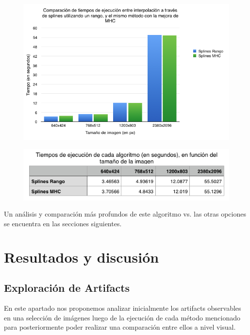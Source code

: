 \documentclass[a4paper]{article}
\begin{document}
\begin{figure}[h!]
    \begin{center}
    \includegraphics[scale=0.65]{imagenes/tiempos/rangmhcg.png}
    \label{tiemposrang}
  \end{center}
\end{figure}

\begin{figure}[h!]
    \begin{center}
    \includegraphics[scale=0.70]{imagenes/tiempos/rangmhct.png}
    \label{tiempos1}
  \end{center}
\end{figure}


Un análisis y comparación más profundos de este algoritmo vs. las otras opciones se encuentra en las secciones siguientes.



\newpage
\section{Resultados y discusi\'on}
\subsection{Exploraci\'on de Artifacts}


En este apartado nos proponemos analizar inicialmente los artifacts observables en una selección de imágenes luego de la ejecución de cada método mencionado para posteriormente poder realizar una comparación entre ellos a nivel visual.
\end{document}
